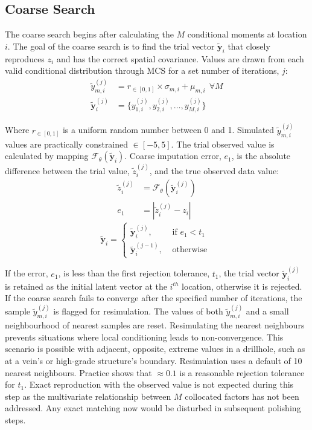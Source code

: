 \subsection{Coarse Search}
\label{subsec:coarse}

The coarse search begins after calculating the $M$ conditional moments at location $i$. The goal of the coarse search is to find the trial vector $\tilde{\mathbf{y}}_{i}$ that closely reproduces $z_{i}$ and has the correct spatial covariance. Values are drawn from each valid conditional distribution through \gls{MCS} for a set number of iterations, $j$:
\begin{align}
    \tilde{y}_{m, i}^{(j)}       & = r_{\in[0,1]} \times \sigma_{m,i} + \mu_{m,i} \ \ \forall M \\
    \tilde{\mathbf{y}}_{i}^{(j)} & = \{ y_{1, i}^{(j)}, y_{2, i}^{(j)}, \dots, y_{M, i}^{(j)}\}
\end{align}

Where $r_{\in[0,1]}$ is a uniform random number between 0 and 1. Simulated $\tilde{y}_{m, i}^{(j)}$ values are practically constrained $\in[-5, 5]$. The trial observed value is calculated by mapping $\mathcal{F}_{\theta}(\tilde{\mathbf{y}}_{i})$. Coarse imputation error, $e_{1}$, is the absolute difference between the trial value, $\tilde{z}_{i}^{(j)}$, and the true observed data value:
\begin{align}
    \tilde{z}_{i}^{(j)} & = \mathcal{F}_{\theta}(\tilde{\mathbf{y}}_{i}^{(j)}) \\
    e_{1}               & = |\tilde{z}_{i}^{(j)} - z_{i}|
\end{align}
\begin{equation}
    \tilde{\mathbf{y}}_{i} =
    \begin{cases}
        \tilde{\mathbf{y}}_{i}^{(j)},   & \text{ if }e_{1} < t_{1} \\
        \tilde{\mathbf{y}}_{i}^{(j-1)}, & \text{ otherwise }
    \end{cases}
\end{equation}

If the error, $e_{1}$, is less than the first rejection tolerance, $t_{1}$, the trial vector $\tilde{\mathbf{y}}_{i}^{(j)}$ is retained as the initial latent vector at the $i^{th}$ location, otherwise it is rejected. If the coarse search fails to converge after the specified number of iterations, the sample $\tilde{y}_{m, i}^{(j)}$ is flagged for resimulation. The values of both $\tilde{y}_{m, i}^{(j)}$ and a small neighbourhood of nearest samples are reset. Resimulating the nearest neighbours prevents situations where local conditioning leads to non-convergence. This scenario is possible with adjacent, opposite, extreme values in a drillhole, such as at a vein's or high-grade structure's boundary. Resimulation uses a default of 10 nearest neighbours. Practice shows that $\approx 0.1$ is a reasonable rejection tolerance for $t_{1}$. Exact reproduction with the observed value is not expected during this step as the multivariate relationship between $M$ collocated factors has not been addressed. Any exact matching now would be disturbed in subsequent polishing steps.


